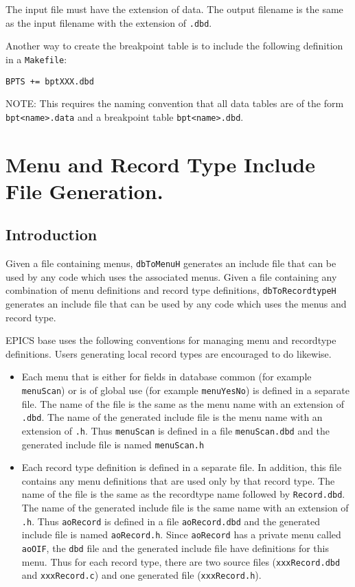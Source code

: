 The input file must have the extension of data.
The output filename is the same as the input filename with the extension of \verb|.dbd|.

Another way to create the breakpoint table is to include the following definition in a \verb|Makefile|:

\begin{verbatim}
BPTS += bptXXX.dbd
\end{verbatim}

NOTE: This requires the naming convention that all data tables are of the form \verb|bpt<name>.data| and a breakpoint table \verb|bpt<name>.dbd|.

\section{Menu and Record Type Include File Generation.}

\subsection{Introduction}

Given a file containing menus, \verb|dbToMenuH| generates an include file that can be used by any code which uses the associated menus.
Given a file containing any combination of menu definitions and record type definitions, \verb|dbToRecordtypeH| generates an include file that can be used by any code which uses the menus and record type.

EPICS base uses the following conventions for managing menu and recordtype definitions.
Users generating local record types are encouraged to do likewise.

\begin{itemize}
\item Each menu that is either for fields in database common (for example \verb|menuScan|) or is of global use (for example \verb|menuYesNo|) is defined in a separate file.
The name of the file is the same as the menu name with an extension of \verb|.dbd|.
The name of the generated include file is the menu name with an extension of \verb|.h|.
Thus \verb|menuScan| is defined in a file \verb|menuScan.dbd| and the generated include file is named \verb|menuScan.h|

\item Each record type definition is defined in a separate file.
In addition, this file contains any menu definitions that are used only by that record type.
The name of the file is the same as the recordtype name followed by \verb|Record.dbd|.
The name of the generated include file is the same name with an extension of \verb|.h|.
Thus \verb|aoRecord| is defined in a file \verb|aoRecord.dbd| and the generated include file is named \verb|aoRecord.h|.
Since \verb|aoRecord| has a private menu called \verb|aoOIF|, the \verb|dbd| file and the generated include file have definitions for this menu.
Thus for each record type, there are two source files (\verb|xxxRecord.dbd| and \verb|xxxRecord.c|) and one generated file (\verb|xxxRecord.h|).
\end{itemize}

